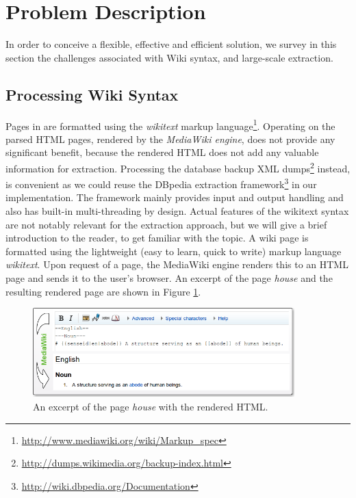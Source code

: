 \section{Problem Description}\label{sec:problem}

In order to conceive a flexible, effective and efficient solution, we survey in this section the challenges associated with Wiki syntax, \wik and large-scale extraction.

\subsection{Processing Wiki Syntax}
Pages in \wik are formatted using the \textit{wikitext} markup language\footnote{\url{http://www.mediawiki.org/wiki/Markup_spec}}.
Operating on the parsed HTML pages, rendered by the \emph{MediaWiki engine}, does not provide any significant benefit, because the rendered HTML does not add any valuable information for extraction. 
Processing the database backup XML dumps\footnote{\url{http://dumps.wikimedia.org/backup-index.html}} instead, is convenient as we could reuse the DBpedia extraction framework\footnote{\url{http://wiki.dbpedia.org/Documentation}} in our implementation. The framework mainly provides input and output handling and also has built-in multi-threading by design.
Actual features of the wikitext syntax are not notably relevant for the extraction approach, but we will give a brief introduction to the reader, to get familiar with the topic. 
A wiki page is formatted using the lightweight (easy to learn, quick to write) markup language \textit{wikitext}. 
Upon request of a page, the MediaWiki engine renders this to an HTML page and sends it to the user's browser. 
An excerpt of the \wik page \textit{house} and the resulting rendered page are shown in Figure \ref{fig:wikitext}.

\begin{figure}[tb]
\centering
\includegraphics[width=0.9\textwidth]{./images/wikitext.png}
\caption{An excerpt of the \wik page \textit{house} with the rendered HTML.}
\label{fig:wikitext}
\end{figure}

